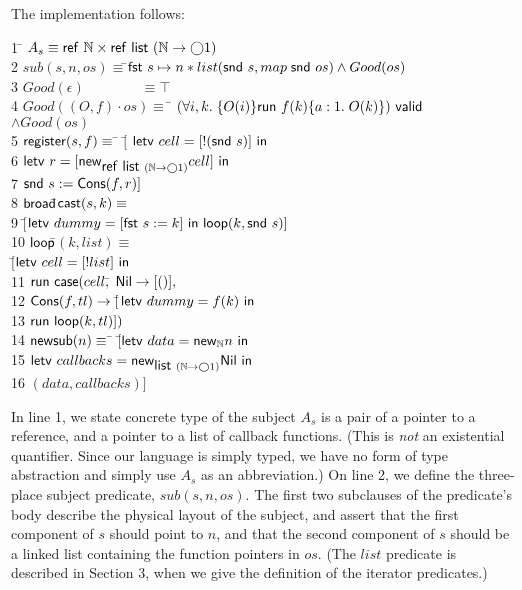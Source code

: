 \documentclass[preprint,natbib]{sigplanconf}
\begin{document}
The implementation follows:
{\small
\begin{tabbing}
1 \qquad \= $A_s \equiv \mbox{\textsf{{ref }}}\mathbb{N} \times \mbox{\textsf{{ref }}}\mbox{\textsf{{list }}}{(\mathbb{N}\to \bigcirc{1})}$
\\[0.5em]
2 \> $sub(s, n, os) \equiv$\=$ \mbox{\textsf{{fst }}} s \mapsto n * 
              list(\mbox{\textsf{{snd }}} s, map\; \mbox{\textsf{{snd }}} os) \land Good(os)$ 
\\[0.5em]
3 \> $Good(\epsilon) \!\qquad\qquad \equiv \top$ \\
4 \> $Good((O,f)\cdot os) \equiv\; $\=
   ${(\forall i,k.\; \{{O(i)}\}{\mbox{\textsf{{run }}}{f(k)}}\{{a:1}.\;{O(k)}\})}\mbox{\textsf{{ valid}}}$ \\
  \> \>      $\land Good(os)$ 
\\[0.5em]
5 \> $\mbox{\textsf{{register}}}(s, f) \equiv$ \=
         $[$\= $\mbox{\textsf{{letv }}}cell = [!(\mbox{\textsf{{snd }}} s)]\mbox{\textsf{{ in }}}$ \\
6 \> \> \> $\mbox{\textsf{{letv }}}r = [\mbox{\textsf{{new}}}_{\mbox{\textsf{{ref }}}\mbox{\textsf{{list }}}{(\mathbb{N}\to \bigcirc{1})}} cell]\mbox{\textsf{{ in }}}$ \\
7 \> \> \> $\mbox{\textsf{{snd }}} s := \mbox{\textsf{{Cons}}}(f, r)]$
\\[0.5em]

8  \> $\mbox{\textsf{{broad}}}$\=$\mbox{\textsf{{cast}}}(s, k) \equiv$ \\
9  \>  \> $[$\=$\mbox{\textsf{{letv }}}dummy = [\mbox{\textsf{{fst }}} s := k]\mbox{\textsf{{ in }}}\mbox{\textsf{{loop}}}(k, \mbox{\textsf{{snd }}} s)]$ \\


10 \> $\mbox{\textsf{{loop}}}$\=$(k, list) \equiv $\\
   \>         \>$[$\=$\mbox{\textsf{{letv }}}cell = [!list]\mbox{\textsf{{ in }}}$ \\
11 \>\>\> $\mbox{\textsf{{run }}}{}\mbox{\textsf{{case}}}(cell,$\= 
            $\mbox{\textsf{{Nil}}} \to [()],$ \\
12 \>\>\>\> $\mbox{\textsf{{Cons}}}(f, tl) \to [$\=$\mbox{\textsf{{letv }}}dummy = f(k)\mbox{\textsf{{ in }}}$ \\
13  \>\>\>\> \> $\mbox{\textsf{{run }}}{\mbox{\textsf{{loop}}}(k,tl)}])$ \\[0.5em]
14 \> $\mbox{\textsf{{new}}}\mbox{\textsf{{sub}}}(n) \equiv$ \=
          $[$\=$\mbox{\textsf{{letv }}}data = \mbox{\textsf{{new}}}_{\mathbb{N}} n\mbox{\textsf{{ in }}}$ \\
15 \> \> \> $\mbox{\textsf{{letv }}}callbacks = \mbox{\textsf{{new}}}_{\mbox{\textsf{{list }}}{(\mathbb{N}\to \bigcirc{1})}} \mbox{\textsf{{Nil}}}\mbox{\textsf{{ in }}}$ \\
16 \> \> \> $(data, callbacks)]$
\end{tabbing}
}

In line 1, we state concrete type of the subject $A_s$ is a pair of a
pointer to a reference, and a pointer to a list of callback
functions. (This is \emph{not} an existential quantifier.  Since our
language is simply typed, we have no form of type abstraction and
simply use $A_s$ as an abbreviation.)  On line 2, we define the
three-place subject predicate, $sub(s,n,os)$. The first two subclauses
of the predicate's body describe the physical layout of the subject,
and assert that the first component of $s$ should point to $n$, and
that the second component of $s$ should be a linked list containing
the function pointers in $os$. (The $list$ predicate is described in
Section 3, when we give the definition of the iterator predicates.)
\end{document}
